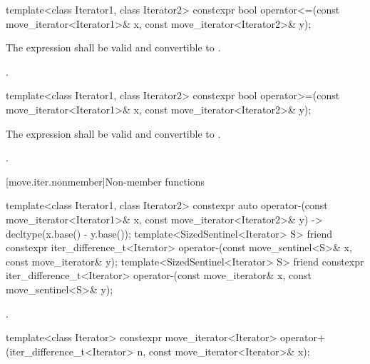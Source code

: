 %
\begin{itemdecl}
template<class Iterator1, class Iterator2>
constexpr bool operator<=(const move_iterator<Iterator1>& x, const move_iterator<Iterator2>& y);
\end{itemdecl}

\begin{itemdescr}
\pnum
\constraints
The expression  shall be valid and
convertible to .

\pnum
\returns {}.
\end{itemdescr}

%
\begin{itemdecl}
template<class Iterator1, class Iterator2>
constexpr bool operator>=(const move_iterator<Iterator1>& x, const move_iterator<Iterator2>& y);
\end{itemdecl}

\begin{itemdescr}
\pnum
\constraints
The expression  shall be valid and
convertible to .

\pnum
\returns {}.
\end{itemdescr}

[move.iter.nonmember]{Non-member functions}

%
\begin{itemdecl}
template<class Iterator1, class Iterator2>
  constexpr auto operator-(const move_iterator<Iterator1>& x,
                           const move_iterator<Iterator2>& y)
    -> decltype(x.base() - y.base());
template<SizedSentinel<Iterator> S>
  friend constexpr iter_difference_t<Iterator>
    operator-(const move_sentinel<S>& x, const move_iterator& y);
template<SizedSentinel<Iterator> S>
  friend constexpr iter_difference_t<Iterator>
    operator-(const move_iterator& x, const move_sentinel<S>& y);
\end{itemdecl}

\begin{itemdescr}
\pnum
\returns {}.
\end{itemdescr}

%
\begin{itemdecl}
template<class Iterator>
  constexpr move_iterator<Iterator>
    operator+(iter_difference_t<Iterator> n, const move_iterator<Iterator>& x);
\end{itemdecl}

